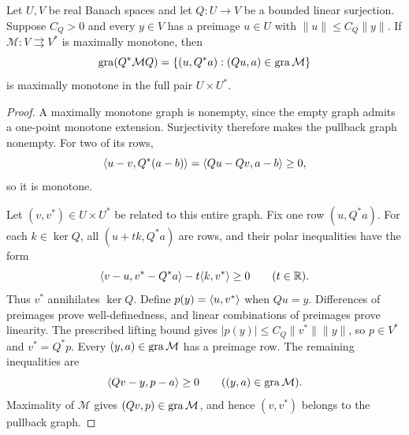 \begin{lemma}
\label{lem:surjection-transport}
Let $U,V$ be real Banach spaces and let $Q:U\to V$ be a bounded
linear surjection. Suppose $C_Q>0$ and every $y\in V$ has a preimage
$u\in U$ with $\|u\|\le C_Q\|y\|$. If
$\mathcal M:V\rightrightarrows V^*$ is maximally monotone, then
\[
\operatorname{gra}(Q^*\mathcal M Q)
=\{(u,Q^*a):(Qu,a)\in\operatorname{gra}\mathcal M\}
\]
is maximally monotone in the full pair $U\times U^*$.
\end{lemma}
\begin{proof}
A maximally monotone graph is nonempty, since the empty graph admits
a one-point monotone extension. Surjectivity therefore makes the
pullback graph nonempty. For two of its rows,
\[
\langle u-v,Q^*(a-b)\rangle=\langle Qu-Qv,a-b\rangle\ge0,
\]
so it is monotone.

Let $(v,v^*)\in U\times U^*$ be related to this entire graph. Fix one
row $(u,Q^*a)$. For each $k\in\ker Q$, all $(u+t k,Q^*a)$ are rows,
and their polar inequalities have the form
\[
\langle v-u,v^*-Q^*a\rangle-t\langle k,v^*\rangle\ge0
\qquad(t\in\mathbb R).
\]
Thus $v^*$ annihilates $\ker Q$. Define $p(y)=\langle u,v^*\rangle$ when
$Qu=y$. Differences of preimages prove well-definedness, and linear
combinations of preimages prove linearity. The prescribed lifting bound
gives $|p(y)|\le C_Q\|v^*\|\|y\|$, so $p\in V^*$ and $v^*=Q^*p$.
Every $(y,a)\in\operatorname{gra}\mathcal M$ has a preimage row. The remaining
inequalities are
\[
\langle Qv-y,p-a\rangle\ge0\qquad((y,a)\in\operatorname{gra}\mathcal M).
\]
Maximality of $\mathcal M$ gives $(Qv,p)\in\operatorname{gra}\mathcal M$, and hence
$(v,v^*)$ belongs to the pullback graph.
\end{proof}


